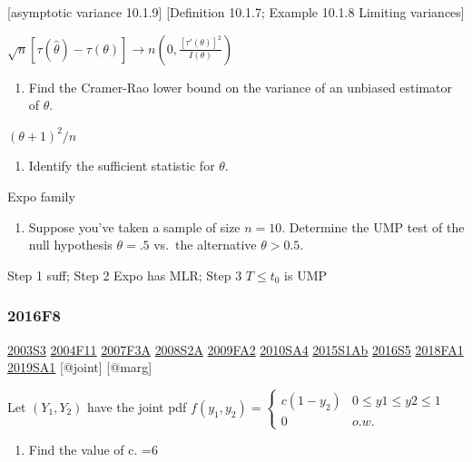 \documentclass[6pt,Portrait]{article}
\providecommand{\tightlist}{%
  \setlength{\itemsep}{0pt}\setlength{\parskip}{0pt}}
\begin{document}
{[}asymptotic variance 10.1.9{]} {[}Definition 10.1.7; Example 10.1.8
Limiting variances{]}

\(\sqrt{n}[\tau(\hat\theta)-\tau(\theta)]\to n(0,\frac{[\tau'(\theta)]^2}{I(\theta)})\)

\begin{enumerate}
\def\labelenumi{(\alph{enumi})}
\setcounter{enumi}{4}
\tightlist
\item
  Find the Cramer-Rao lower bound on the variance of an unbiased
  estimator of \(\theta\).
\end{enumerate}

\((\theta+1)^2/n\)

\begin{enumerate}
\def\labelenumi{(\alph{enumi})}
\setcounter{enumi}{5}
\tightlist
\item
  Identify the sufficient statistic for \(\theta\).
\end{enumerate}

Expo family

\begin{enumerate}
\def\labelenumi{(\alph{enumi})}
\setcounter{enumi}{6}
\tightlist
\item
  Suppose you've taken a sample of size \(n=10\). Determine the UMP test
  of the null hypothesis \(\theta=.5\) vs.~the alternative
  \(\theta>0.5\).
\end{enumerate}

Step 1 suff; Step 2 Expo has MLR; Step 3 \(T\le t_0\) is UMP

\hypertarget{f8-4}{%
\subsubsection{2016F8}\label{f8-4}}

\protect\hyperlink{s3}{2003S3} \protect\hyperlink{f11}{2004F11}
\protect\hyperlink{f3a}{2007F3A} \protect\hyperlink{s2a}{2008S2A}
\protect\hyperlink{fa2}{2009FA2} \protect\hyperlink{sa4-1}{2010SA4}
\protect\hyperlink{s1ab}{2015S1Ab} \protect\hyperlink{s5-4}{2016S5}
\protect\hyperlink{fa1-4}{2018FA1} \protect\hyperlink{sa1-3}{2019SA1}
{[}@joint{]} {[}@marg{]}

Let \((Y_1,Y_2)\) have the joint pdf
\(f(y_1,y_2)=\begin{cases}c(1-y_2)&0\le y1\le y2\le 1\\0& o.w.\end{cases}\)

\begin{enumerate}
\def\labelenumi{(\alph{enumi})}
\tightlist
\item
  Find the value of c. =6
\end{enumerate}
\end{document}

